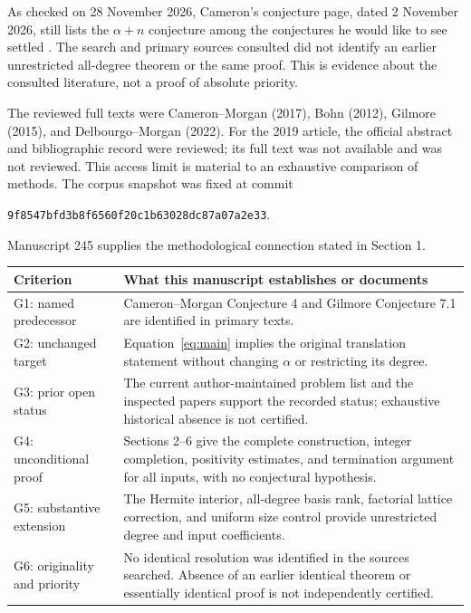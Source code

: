 \documentclass[11pt,a4paper]{article}
\theoremstyle{definition}
\begin{document}
As checked on 28 November 2026, Cameron's conjecture page, dated
2 November 2026, still lists the $\alpha+n$ conjecture among the
conjectures he would like to see settled \cite{CameronWeb}. The search
and primary sources consulted did not identify an earlier unrestricted
all-degree theorem or the same proof. This is evidence about the
consulted literature, not a proof of absolute priority.

The reviewed full texts were Cameron--Morgan (2017), Bohn (2012),
Gilmore (2015), and Delbourgo--Morgan (2022).
For the 2019 article, the official abstract and bibliographic record
were reviewed; its full text was not available and was not reviewed.
This access limit is material to an exhaustive comparison of methods.
The corpus snapshot was fixed at commit
\begin{center}
\small\texttt{9f8547bfd3b8f6560f20c1b63028dc87a07a2e33}.
\end{center}
Manuscript 245 supplies the methodological connection stated in Section 1.

\begin{center}
\small
\begin{tabularx}{\linewidth}{@{}l X@{}}
\toprule
Criterion & What this manuscript establishes or documents\\
\midrule
G1: named predecessor & Cameron--Morgan Conjecture 4 and Gilmore
Conjecture 7.1 are identified in primary texts.\\[3pt]
G2: unchanged target & Equation~\eqref{eq:main} implies the original
translation statement without changing $\alpha$ or restricting its degree.\\[3pt]
G3: prior open status & The current author-maintained problem list and
the inspected papers support the recorded status; exhaustive historical
absence is not certified.\\[3pt]
G4: unconditional proof & Sections 2--6 give the complete construction,
integer completion, positivity estimates, and termination argument for
all inputs, with no conjectural hypothesis.\\[3pt]
G5: substantive extension & The Hermite interior, all-degree basis rank,
factorial lattice correction, and uniform size control provide
unrestricted degree and input coefficients.\\[3pt]
G6: originality and priority & No identical resolution was identified
in the sources searched. Absence of an earlier identical theorem or
essentially identical proof is not independently certified.\\
\bottomrule
\end{tabularx}
\end{center}
\end{document}
